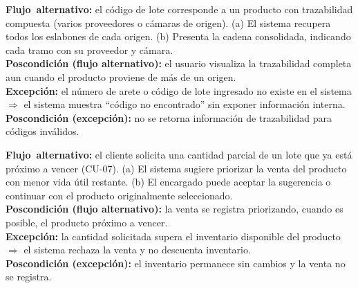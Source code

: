 \documentclass[11pt,a4paper]{article}
\begin{document}
\noindent\textbf{\mbox{Flujo alternativo}:} el código de lote corresponde a un producto con trazabilidad compuesta (varios proveedores o cámaras de origen). (a) El sistema recupera todos los eslabones de cada origen. (b) Presenta la cadena consolidada, indicando cada tramo con su proveedor y cámara.\\
\textbf{Poscondición (flujo alternativo):} el usuario visualiza la trazabilidad completa aun cuando el producto proviene de más de un origen.\\
\noindent\textbf{\mbox{Excepción}:} el número de arete o código de lote ingresado no existe en el sistema $\Rightarrow$ el sistema muestra ``código no encontrado'' sin exponer información interna.\\
\textbf{Poscondición (excepción):} no se retorna información de trazabilidad para códigos inválidos.
\vspace{0.35cm}

\noindent\textbf{\mbox{Flujo alternativo}:} el cliente solicita una cantidad parcial de un lote que ya está próximo a vencer (CU-07). (a) El sistema sugiere priorizar la venta del producto con menor vida útil restante. (b) El encargado puede aceptar la sugerencia o continuar con el producto originalmente seleccionado.\\
\textbf{Poscondición (flujo alternativo):} la venta se registra priorizando, cuando es posible, el producto próximo a vencer.\\
\noindent\textbf{\mbox{Excepción}:} la cantidad solicitada supera el inventario disponible del producto $\Rightarrow$ el sistema rechaza la venta y no descuenta inventario.\\
\textbf{Poscondición (excepción):} el inventario permanece sin cambios y la venta no se registra.
\vspace{0.35cm}
\end{document}
